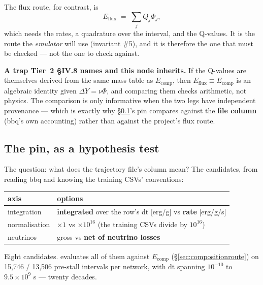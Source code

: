 The flux route, for contrast, is
%
\begin{equation}\label{eq:eflux}
E_{\mathrm{flux}} \;=\; \sum_j Q_j \Phi_j ,
\end{equation}
%
which needs the rates, a quadrature over the interval, and the Q-values. It is
the route the \emph{emulator} will use (invariant \#5), and it is therefore the
one that must be checked --- not the one to check against.

\begin{warn}
\textbf{A trap Tier~2 \S IV.8 names and this node inherits.} If the Q-values
are themselves derived from the same mass table as $E_{\mathrm{comp}}$, then
$E_{\mathrm{flux}} \equiv E_{\mathrm{comp}}$ is an algebraic identity given
$\Delta Y = \nu\Phi$, and comparing them checks arithmetic, not physics. The
comparison is only informative when the two legs have independent provenance
--- which is exactly why \S\ref{sec:pin}'s pin compares against the
\textbf{file column} (bbq's own accounting) rather than against the project's
flux route.
\end{warn}

\subsection{The pin, as a hypothesis test}
\label{sec:pin}

The question: what does the trajectory file's  column mean? The
candidates, from reading bbq and knowing the training CSVs' conventions:

\begin{tabularx}{\textwidth}{@{}L{3.0cm} Y@{}}
\toprule
\textbf{axis} & \textbf{options} \\
\midrule
integration & \textbf{integrated} over the row's dt [erg/g] vs \textbf{rate}
  [erg/g/s] \\
normalisation & $\times 1$ vs $\times 10^{16}$ (the training CSVs divide by
  $10^{16}$) \\
neutrinos & gross vs \textbf{net of neutrino losses} \\
\bottomrule
\end{tabularx}

Eight candidates.  evaluates all of them
against $E_{\mathrm{comp}}$ (\S\ref{sec:compositionroute}) on 15,746 / 13,506
pre-stall intervals per network, with dt spanning $10^{-10}$ to
$9.5 \times 10^{9}$ s --- twenty decades.

